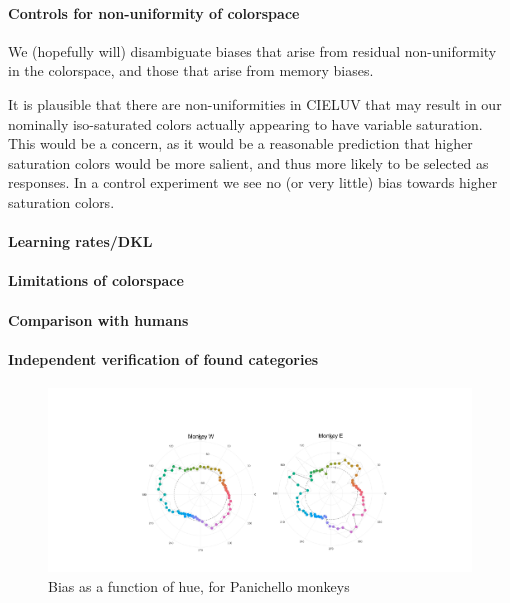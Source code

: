 \paragraph{Controls for non-uniformity of colorspace}

We (hopefully will) disambiguate biases that arise from residual non-uniformity in the colorspace, and those that arise from memory biases.

It is plausible that there are non-uniformities in CIELUV that may result in our nominally iso-saturated colors actually appearing to have variable saturation. This would be a concern, as it would be a reasonable prediction that higher saturation colors would be more salient, and thus more likely to be selected as responses. In a control experiment we see no (or very little) bias towards higher saturation colors.



\paragraph{Learning rates/DKL}
\paragraph{Limitations of colorspace}
\paragraph{Comparison with humans}
\paragraph{Independent verification of found categories}

\begin{figure}
\includegraphics[width=\textwidth]{../../Figures/Old/panichellobias.pdf}
\caption{Bias as a function of hue, for Panichello monkeys} 
\end{figure}


